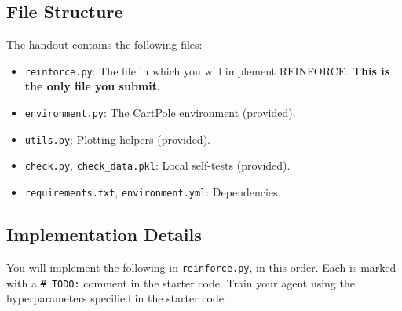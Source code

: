 \subsection{File Structure}

The handout contains the following files:

\begin{itemize}
    \item \texttt{reinforce.py}: The file in which you will implement REINFORCE.
    \textbf{This is the only file you submit.}
    \item \texttt{environment.py}: The CartPole environment (provided).
    \item \texttt{utils.py}: Plotting helpers (provided).
    \item \texttt{check.py}, \texttt{check\_data.pkl}: Local self-tests (provided).
    \item \texttt{requirements.txt}, \texttt{environment.yml}: Dependencies.
\end{itemize}

\subsection{Implementation Details}

You will implement the following in \texttt{reinforce.py}, in this order. Each is
marked with a \verb|# TODO:| comment in the starter code. Train your agent using
the hyperparameters specified in the starter code.

